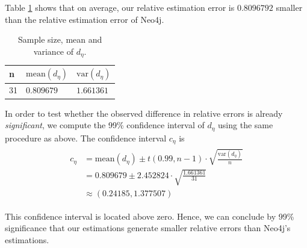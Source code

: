 Table \ref{table:rel-error-diff-stats} shows that
on average, our relative estimation error is $0.8096792$ smaller than
the relative estimation error of Neo4j.

\begin{table}[h]
\centering
\begin{tabular}{@{}lll@{}}
\toprule
n  & $\text{mean}(d_\eta)$ & $\text{var}(d_\eta)$ \\ \midrule
31 & $0.809679$          & $1.661361$             \\ \bottomrule
\end{tabular}
\caption{Sample size, mean and variance of $d_\eta$.}
\label{table:rel-error-diff-stats}
\end{table}

In order to test whether the observed difference in relative errors is already
\emph{significant}, we compute the 99\% confidence interval of $d_\eta$ using
the same procedure as above.
The confidence interval $c_\eta$ is
\begin{align}
\begin{split}
  c_\eta &= \text{mean}(d_\eta) \pm t(0.99, n - 1)
            \cdot \sqrt{\frac{\text{var}(d_\eta)}{n}} \\
         &= 0.809679 \pm 2.452824
            \cdot \sqrt{\frac{1.661361}{31}} \\
         &\approx (0.24185, 1.377507)
\end{split}
\end{align}

This confidence interval is located above zero.
Hence, we can conclude by 99\% significance that our estimations generate
smaller relative errors than Neo4j's estimations.
